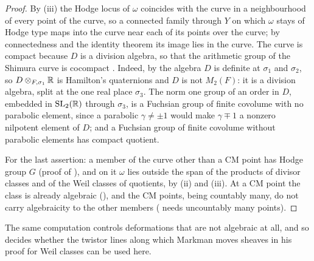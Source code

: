 \begin{proof}
By (iii) the Hodge locus of $\omega$ coincides with the
curve in a neighbourhood of every point of the curve, so a connected family
through $Y$ on which $\omega$ stays of Hodge type maps into the curve near
each of its points over the curve; by connectedness and the identity theorem
its image lies in the curve. The curve is compact because $D$ is a division
algebra, so that the arithmetic group of the Shimura curve is cocompact
\cite{Mum69}. Indeed, by  the algebra $D$ is definite at
$\sigma_{1}$ and $\sigma_{2}$, so $D\otimes_{F,\sigma_{1}}\mathbb{R}$ is Hamilton's
quaternions and $D$ is not $M_{2}(F)$: it is a division algebra, split at the
one real place $\sigma_{3}$. The norm one group of an order in $D$, embedded
in $\operatorname{SL}_{2}(\mathbb{R})$ through $\sigma_{3}$, is a Fuchsian group of finite
covolume with no parabolic element, since a parabolic $\gamma\ne\pm1$ would
make $\gamma\mp1$ a nonzero nilpotent element of $D$; and a Fuchsian group of
finite covolume without parabolic elements has compact quotient.

For the last assertion: a member of the curve other than a CM point has
Hodge group $G$ (proof of ), and on it $\omega$ lies
outside the span of the products of divisor classes and of the Weil classes
of quotients, by (ii) and (iii). At a CM point the
class is already algebraic (), and the CM points, being
countably many, do not carry algebraicity to the other members
( needs uncountably many points).
\end{proof}

The same computation controls deformations that are not algebraic at all,
and so decides whether the twistor lines along which Markman moves sheaves
in his proof for Weil classes can be used here.

